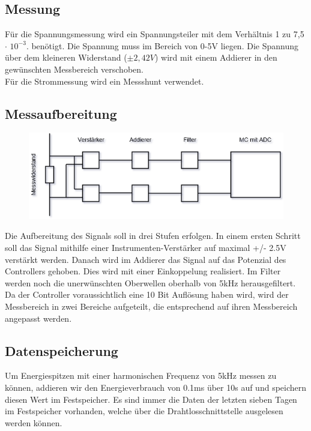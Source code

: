 \documentclass[12pt,a4paper]{article}
\begin{document}
\subsection{Messung}
Für die Spannungsmessung wird ein Spannungsteiler mit dem Verhältnis 1 zu 7,5 $\cdot$ $10^{-3}$. benötigt. Die Spannung muss im Bereich von 0-5V liegen. Die Spannung über dem kleineren Widerstand ($\pm 2,42V$) wird mit einem Addierer in den gewünschten Messbereich verschoben.\\
Für die Strommessung wird ein Messshunt verwendet.
\subsection{Messaufbereitung}
\begin{figure}[htbp] 
  \centering
\includegraphics[scale=0.9]{Block-Messung.png}
  \caption{}
  \label{fig:Bild1}
\end{figure}

Die Aufbereitung des Signals soll in drei Stufen erfolgen. In einem ersten Schritt soll das Signal mithilfe einer Instrumenten-Verstärker auf maximal +/- 2.5V verstärkt werden. Danach wird im Addierer das Signal auf das Potenzial des Controllers gehoben. Dies wird mit einer Einkoppelung realisiert. Im Filter werden noch die unerwünschten Oberwellen oberhalb von 5kHz herausgefiltert. Da der Controller voraussichtlich eine 10 Bit Auflösung haben wird, wird der Messbereich in zwei Bereiche aufgeteilt, die entsprechend auf ihren Messbereich angepasst werden.
\subsection{Datenspeicherung}
Um Energiespitzen mit einer harmonischen Frequenz von 5kHz messen zu können, addieren wir den Energieverbrauch von 0.1ms über 10s auf und speichern diesen Wert im Festspeicher. Es sind immer die Daten der letzten sieben Tagen im Festspeicher vorhanden, welche über die Drahtlosschnittstelle ausgelesen werden können.
\end{document}
